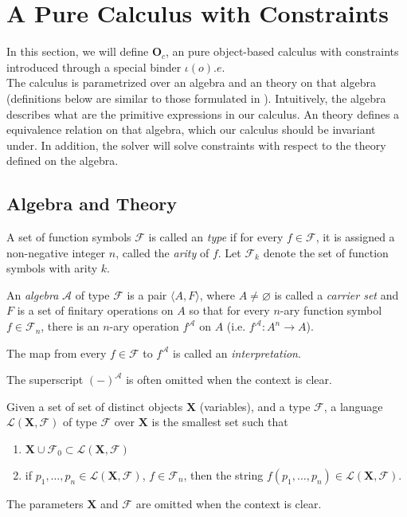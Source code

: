 \section{A Pure Calculus with Constraints}

In this section, we will define $\textbf{O}_c$, an pure object-based calculus with
constraints introduced through a special binder $\iota(o).e$.\\

The calculus is parametrized over an algebra and an theory on that algebra
(definitions below are similar to those formulated in \cite{burris1981course, Birkhoff_1935}).
Intuitively, the algebra describes what are the primitive expressions in our
calculus. An theory defines a equivalence relation on that algebra, which our
calculus should be invariant under. In addition, the solver will solve
constraints with respect to the theory defined on the algebra.

\subsection{Algebra and Theory}

\begin{defn}[Type]
  A set of function symbols $\mathscr{F}$ is called an \emph{type} if for every
  $f \in \mathscr{F}$, it is assigned a non-negative integer $n$, called the
  \emph{arity} of $f$. Let $\mathscr{F}_k$ denote the set of function symbols
  with arity $k$.
\end{defn}

\begin{defn}[Algebra]
  An \emph{algebra} $\mathcal{A}$ of type $\mathscr{F}$ is a pair $\langle A , F
  \rangle$, where $A \neq \varnothing$ is called a \emph{carrier set} and $F$ is
  a set of finitary operations on $A$ so that for every $n$-ary function symbol
  $f \in \mathscr{F}_{n}$, there is an $n$-ary operation $f^{\mathcal{A}}$ on $A$
  (i.e. $f^{\mathcal{A}} : A^{n} \to A$).

  The map from every $f \in \mathscr{F}$ to $f^{\mathcal{A}}$ is called an \emph{interpretation}.

  The superscript $(-)^{\mathcal{A}}$ is often omitted when the context is
  clear.
\end{defn}

\begin{defn}[Language]
  Given a set of set of distinct objects $\textbf{X}$ (variables), and a type
  $\mathscr{F}$, a language $\mathcal{L}(\textbf{X},\mathscr{F})$ of type
  $\mathscr{F}$ over $\textbf{X}$ is the smallest set such that
  \begin{enumerate}
    \item $\textbf{X} \cup \mathscr{F}_0 \subset \mathcal{L}(\textbf{X},\mathscr{F})$
    \item if $p_1 , \ldots , p_n \in \mathcal{L}(\textbf{X},\mathscr{F})$, $f \in \mathscr{F}_n$, then the
      string $f(p_1, \ldots, p_n) \in \mathcal{L}(\textbf{X},\mathscr{F})$.
  \end{enumerate}

  The parameters $\textbf{X}$ and $\mathscr{F}$ are omitted when the context is clear.
\end{defn}

